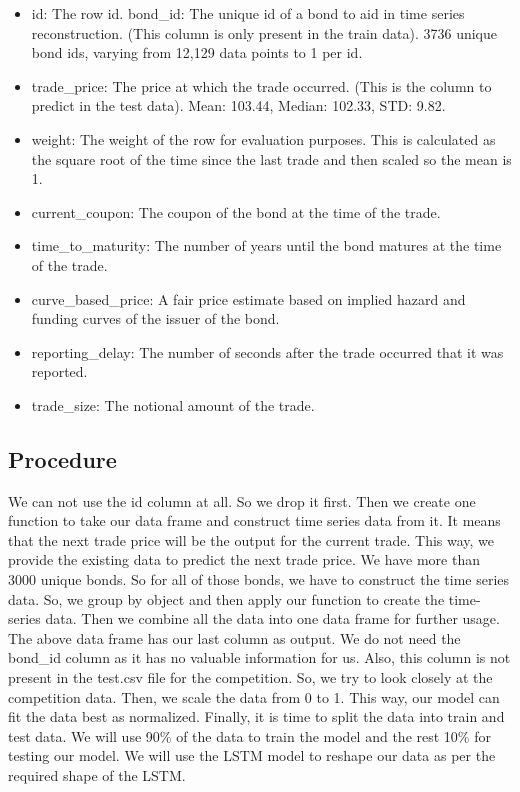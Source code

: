 \documentclass[
  man]{apa6}
\providecommand{\tightlist}{%
  \setlength{\itemsep}{0pt}\setlength{\parskip}{0pt}}
\begin{document}
\begin{itemize}
\tightlist
\item
  id: The row id. bond\_id: The unique id of a bond to aid in time series reconstruction. (This column is only present in the train data). 3736 unique bond ids, varying from 12,129 data points to 1 per id.
\item
  trade\_price: The price at which the trade occurred. (This is the column to predict in the test data). Mean: 103.44, Median: 102.33, STD: 9.82.
\item
  weight: The weight of the row for evaluation purposes. This is calculated as the square root of the time since the last trade and then scaled so the mean is 1.
\item
  current\_coupon: The coupon of the bond at the time of the trade.
\item
  time\_to\_maturity: The number of years until the bond matures at the time of the trade.
\item
  curve\_based\_price: A fair price estimate based on implied hazard and funding curves of the issuer of the bond.
\item
  reporting\_delay: The number of seconds after the trade occurred that it was reported.
\item
  trade\_size: The notional amount of the trade.
\end{itemize}

\hypertarget{procedure}{%
\subsection{Procedure}\label{procedure}}

We can not use the id column at all. So we drop it first. Then we create one function to take our data frame and construct time series data from it. It means that the next trade price will be the output for the current trade. This way, we provide the existing data to predict the next trade price. We have more than 3000 unique bonds. So for all of those bonds, we have to construct the time series data. So, we group by object and then apply our function to create the time-series data. Then we combine all the data into one data frame for further usage. The above data frame has our last column as output. We do not need the bond\_id column as it has no valuable information for us. Also, this column is not present in the test.csv file for the competition. So, we try to look closely at the competition data. Then, we scale the data from 0 to 1. This way, our model can fit the data best as normalized. Finally, it is time to split the data into train and test data. We will use 90\% of the data to train the model and the rest 10\% for testing our model. We will use the LSTM model to reshape our data as per the required shape of the LSTM.
\end{document}
